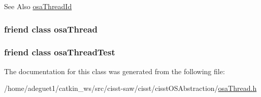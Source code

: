 \begin{DoxySeeAlso}{See Also}
\hyperlink{classosa_thread_id}{osa\-Thread\-Id} 
\end{DoxySeeAlso}
\hypertarget{classosa_thread_id_a35e7a1b0202c45103302d0073f377e57}{
\subsubsection[{osa\-Thread}]{\setlength{\rightskip}{0pt plus 5cm}friend class {\bf osa\-Thread}\hspace{0.3cm}{\ttfamily [friend]}}}\label{classosa_thread_id_a35e7a1b0202c45103302d0073f377e57}
\hypertarget{classosa_thread_id_a542e7acdd9a832dddf65bf204d2df936}{
\subsubsection[{osa\-Thread\-Test}]{\setlength{\rightskip}{0pt plus 5cm}friend class osa\-Thread\-Test\hspace{0.3cm}{\ttfamily [friend]}}}\label{classosa_thread_id_a542e7acdd9a832dddf65bf204d2df936}


The documentation for this class was generated from the following file\-:\begin{DoxyCompactItemize}
\item 
/home/adeguet1/catkin\-\_\-ws/src/cisst-\/saw/cisst/cisst\-O\-S\-Abstraction/\hyperlink{osa_thread_8h}{osa\-Thread.\-h}\end{DoxyCompactItemize}
